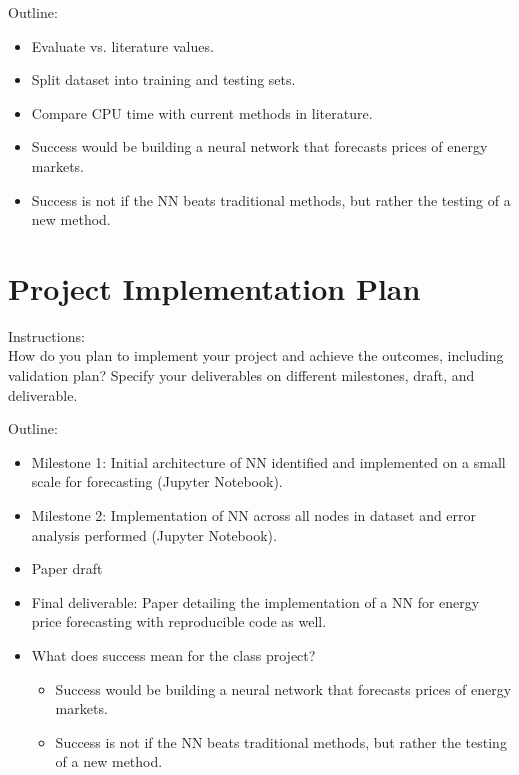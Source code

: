 \documentclass[sigconf]{acmart}
\begin{document}
Outline:
\begin{itemize}
    \item Evaluate vs. literature values.
    \item Split dataset into training and testing sets.
    \item Compare CPU time with current methods in literature.
    \item Success would be building a neural network that forecasts prices of energy markets. 
    \item Success is not if the NN beats traditional methods, but rather the testing of a new method. 
\end{itemize}


\section{Project Implementation Plan}
Instructions:\\
How do you plan to implement your project and achieve the outcomes, including validation plan? Specify your deliverables on different milestones, draft, and deliverable. 

Outline:
\begin{itemize}
    	\item Milestone 1: Initial architecture of NN identified and implemented on a small scale for forecasting (Jupyter Notebook).
    	\item Milestone 2: Implementation of NN across all nodes in dataset and error analysis performed (Jupyter Notebook).
	\item Paper draft 
	\item Final deliverable: Paper detailing the implementation of a NN for energy price forecasting with reproducible code as well. 
   	\item What does success mean for the class project?
	\begin{itemize}
		\item Success would be building a neural network that forecasts prices of energy markets. 
		\item Success is not if the NN beats traditional methods, but rather the testing of a new method. 
	\end{itemize}
\end{itemize}
\end{document}
